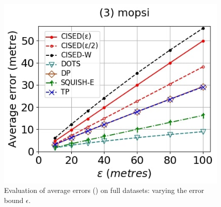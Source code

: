 \begin{figure}[tb!]
	\includegraphics[scale=0.250]{Figures/Exp-SED-error-epsilon-mopsi.jpg}		
	\vspace{-2ex}
	\caption{\small Evaluation of average errors (\sed) on full datasets: varying the error bound $\epsilon$.}
	\label{fig:ae-sed-epsilon}
	\vspace{-2ex}
\end{figure}

